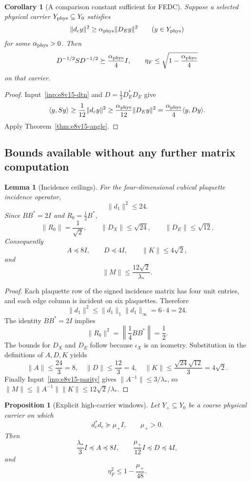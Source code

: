 \documentclass[11pt,oneside]{book}
\newtheorem{lemma}[theorem]{Lemma}
\newtheorem{proposition}[theorem]{Proposition}
\newtheorem{corollary}[theorem]{Corollary}
\theoremstyle{definition}
\theoremstyle{remark}
\begin{document}
\begin{corollary}[A comparison constant sufficient for FEDC]
\label{cor:e8v15-alpha}
Suppose a selected physical carrier \(Y_{\rm phys}\subseteq Y_0\)
satisfies
\[
       \|d_cy\|^2\geq\alpha_{\rm phys}\|D_Ey\|^2
       \qquad(y\in Y_{\rm phys})
\]
for some \(\alpha_{\rm phys}>0\).  Then
\[
 D^{-1/2}SD^{-1/2}\succeq\frac{\alpha_{\rm phys}}4 I,
\qquad
 \eta_F\leq\sqrt{1-\frac{\alpha_{\rm phys}}4}
\]
on that carrier.
\end{corollary}

\begin{proof}
Input~\ref{inp:e8v15-dtn} and \(D=\frac13D_E^*D_E\) give
\[
\langle y,Sy\rangle
\geq\frac1{12}\|d_cy\|^2
\geq\frac{\alpha_{\rm phys}}{12}\|D_Ey\|^2
=\frac{\alpha_{\rm phys}}4\langle y,Dy\rangle .
\]
Apply Theorem~\ref{thm:e8v15-angle}.
\end{proof}

\subsection{Bounds available without any further matrix computation}

\begin{lemma}[Incidence ceilings]
\label{lem:e8v15-incidence}
For the four-dimensional cubical plaquette incidence operator,
\[
                  \|d_1\|^2\leq24.
\]
Since \(BB^*=2I\) and \(R_0=\frac12B^*\),
\[
 \|R_0\|=\frac1{\sqrt2},\qquad
 \|D_X\|\leq\sqrt{24},\qquad
 \|D_E\|\leq\sqrt{12}.
\]
Consequently
\[
 A\preceq8I,\qquad D\preceq4I,\qquad
 \|K\|\leq4\sqrt2,
\]
and
\[
        \|M\|\leq\frac{12\sqrt2}{\lambda_*}.
\]
\end{lemma}

\begin{proof}
Each plaquette row of the signed incidence matrix has four unit
entries, and each edge column is incident on six plaquettes.  Therefore
\[
 \|d_1\|^2\leq\|d_1\|_1\|d_1\|_\infty=6\cdot4=24.
\]
The identity \(BB^*=2I\) implies
\[
\|R_0\|^2
=\left\|\frac14BB^*\right\|=\frac12.
\]
The bounds for \(D_X\) and \(D_E\) follow because \(\iota_X\) is an
isometry.  Substitution in the definitions of \(A,D,K\) yields
\[
\|A\|\leq\frac{24}{3}=8,\quad
\|D\|\leq\frac{12}{3}=4,\quad
\|K\|\leq\frac{\sqrt{24}\sqrt{12}}3=4\sqrt2.
\]
Finally Input~\ref{inp:e8v15-parity} gives
\(\|A^{-1}\|\leq3/\lambda_*\), so
\(\|M\|\leq\|A^{-1}\|\|K\|\leq12\sqrt2/\lambda_*\).
\end{proof}

\begin{proposition}[Explicit high-carrier windows]
\label{prop:e8v15-windows}
Let \(Y_+\subseteq Y_0\) be a coarse physical carrier on which
\[
             d_c^*d_c\succeq\mu_+ I,\qquad \mu_+>0.
\]
Then
\[
\frac{\lambda_*}{3}I\preceq A\preceq8I,
\qquad
\frac{\mu_+}{12}I\preceq D\preceq4I,
\]
and
\[
\boxed{\qquad
 \eta_F^2\leq1-\frac{\mu_+}{48}.
\qquad}
\]
\end{proposition}
\end{document}
